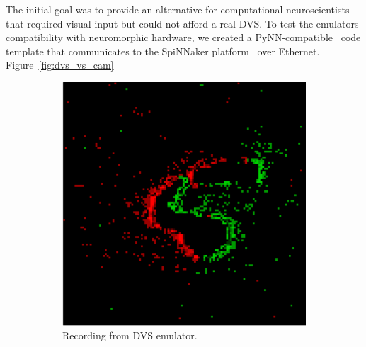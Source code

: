 \documentclass[conference]{IEEEtran}
\begin{document}
The initial goal was to provide an alternative for computational neuroscientists that required visual input but could not afford a real DVS. To test the emulators compatibility with neuromorphic hardware, we created a PyNN-compatible~\cite{pynn} code template that communicates to the SpiNNaker platform~\cite{spinnakerOverview} over Ethernet. Figure~\ref{fig:dvs_vs_cam}

\begin{figure}[htb]
\captionsetup[subfigure]{justification=centering}

\centering
\begin{subfigure}[b]{0.24\textwidth}
  \includegraphics[width=\textwidth]{camera_demo}
  \caption{Recording from DVS emulator. }
  \label{fig:cam_demo}
\end{subfigure}
\begin{subfigure}[b]{0.24\textwidth}

\end{subfigure}
\end{figure}
\end{document}
